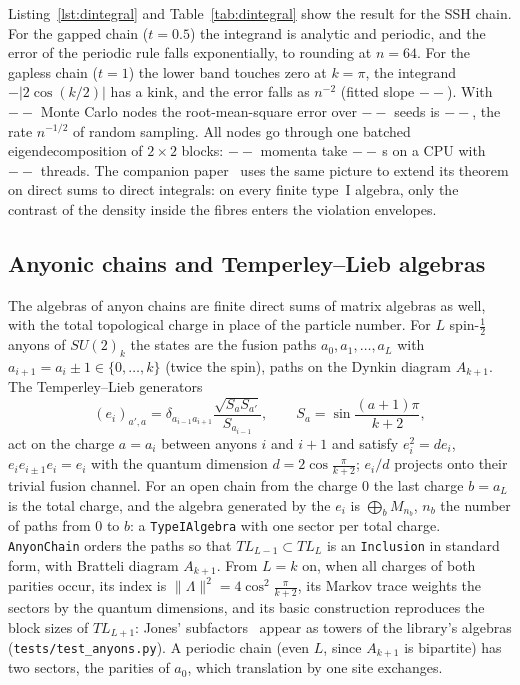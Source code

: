 \documentclass[11pt]{article}
\providecommand{\DISlope}{--}\providecommand{\DIMCNodes}{--}\providecommand{\DIMCSeeds}{--}\providecommand{\DIMCErr}{--}
\providecommand{\DIBigNodes}{--}\providecommand{\DIBigTime}{--}\providecommand{\DIThreads}{--}
\begin{document}
Listing~\ref{lst:dintegral} and Table~\ref{tab:dintegral} show the result for the SSH chain. For the gapped chain
($t=0.5$) the integrand is analytic and periodic, and the error of the periodic rule falls exponentially, to rounding at
$n=64$. For the gapless chain ($t=1$) the lower band touches zero at $k=\pi$, the integrand $-|2\cos(k/2)|$ has a kink,
and the error falls as $n^{-2}$ (fitted slope $\DISlope$). With $\DIMCNodes$ Monte Carlo nodes the root-mean-square error
over $\DIMCSeeds$ seeds is $\DIMCErr$, the rate $n^{-1/2}$ of random sampling. All nodes go through one batched
eigendecomposition of $2\times2$ blocks: $\DIBigNodes$ momenta take $\DIBigTime$\,s on a CPU with $\DIThreads$ threads.
The companion paper~\cite{nn_trace} uses the same picture to extend its theorem on direct sums to direct integrals: on
every finite type~I algebra, only the contrast of the density inside the fibres enters the violation envelopes.

\subsection{Anyonic chains and Temperley--Lieb algebras}\label{sec:anyons}

The algebras of anyon chains are finite direct sums of matrix algebras as well, with the total topological charge in
place of the particle number. For $L$ spin-$\frac12$ anyons of $SU(2)_k$ the states are the fusion paths
$a_0,a_1,\dots,a_L$ with $a_{i+1}=a_i\pm1\in\{0,\dots,k\}$ (twice the spin), paths on the Dynkin diagram $A_{k+1}$. The
Temperley--Lieb generators~\cite{temperley1971}
\[
  (e_i)_{a',a}=\delta_{a_{i-1}a_{i+1}}\frac{\sqrt{S_aS_{a'}}}{S_{a_{i-1}}},\qquad S_a=\sin\frac{(a+1)\pi}{k+2},
\]
act on the charge $a=a_i$ between anyons $i$ and $i+1$ and satisfy $e_i^2=de_i$, $e_ie_{i\pm1}e_i=e_i$ with the quantum
dimension $d=2\cos\frac{\pi}{k+2}$; $e_i/d$ projects onto their trivial fusion channel. For an open chain from the charge
$0$ the last charge $b=a_L$ is the total charge, and the algebra generated by the $e_i$ is $\bigoplus_bM_{n_b}$, $n_b$ the
number of paths from $0$ to $b$: a \texttt{TypeIAlgebra} with one sector per total charge. \texttt{AnyonChain} orders the
paths so that $TL_{L-1}\subset TL_L$ is an \texttt{Inclusion} in standard form, with Bratteli diagram $A_{k+1}$. From
$L=k$ on, when all charges of both parities occur, its index is $\|\Lambda\|^2=4\cos^2\frac{\pi}{k+2}$, its Markov trace
weights the sectors by the quantum dimensions, and its basic construction reproduces the block sizes of $TL_{L+1}$: Jones'
subfactors~\cite{jones1983,ghj1989} appear as towers of the library's algebras (\texttt{tests/test\_anyons.py}). A
periodic chain (even $L$, since $A_{k+1}$ is bipartite) has two sectors, the parities of $a_0$, which translation by one
site exchanges.
\end{document}
